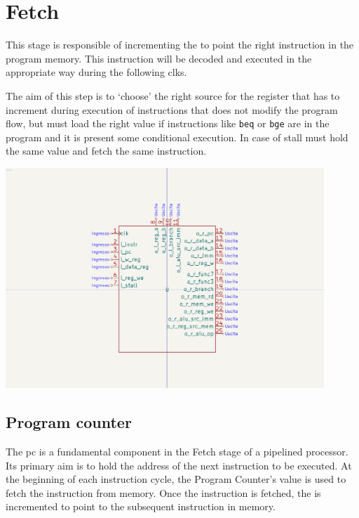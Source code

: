 \documentclass{article}
\begin{document}
\section{Fetch}
\begin{minipage}{0.48\textwidth}
This stage is responsible of incrementing the \PC to point the right instruction in the program memory.
This instruction will be decoded and executed in the appropriate way during the following \glspl{clk}. 

The aim of this step is to `choose' the right source for the \PC register that has to increment during execution of instructions that does not modify the program flow, but must load the right value if instructions like \texttt{beq} or \texttt{bge} are in the program and it is present some conditional execution.
In case of \gls{stall} must hold the same value and fetch the same instruction.
\end{minipage}
\begin{minipage}{0.48\textwidth}
  \includegraphics[width=0.9\textwidth,right,trim={400 150 400 150},clip]{components/Decode.png}
\end{minipage}

\subsection{Program counter}\label{PC}

    The \acrfull{pc} is a fundamental component in the Fetch stage of a pipelined \RISCV processor. Its primary aim is to hold the address of the next instruction to be executed. At the beginning of each instruction cycle, the Program Counter's value is used to fetch the instruction from memory. Once the instruction is fetched, the \PC is incremented to point to the subsequent instruction in memory.
    
\end{document}
